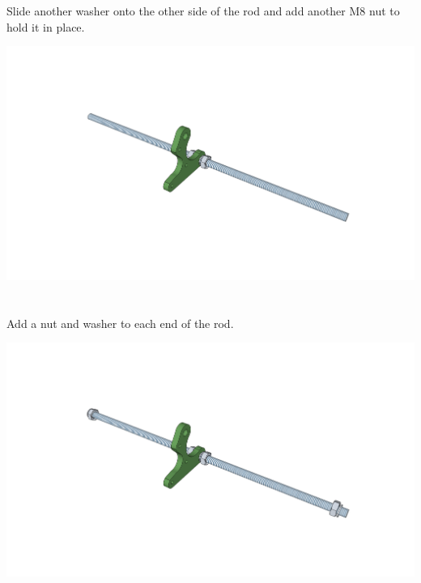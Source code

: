 \documentclass[twoside,a4paper,titlepage]{memoir}
\begin{document}
	\section{}
	Slide another washer onto the other side of the rod and add another M8 nut to hold it in place.\\
	\begin{center}
		\includegraphics[width=1\linewidth]{graphics/ch2_3.png}
	\end{center}
	
	\section{}
	Add a nut and washer to each end of the rod.\\
	\begin{center}
		\includegraphics[width=1\linewidth]{graphics/ch2_4.png}
	\end{center}
	
\end{document}
